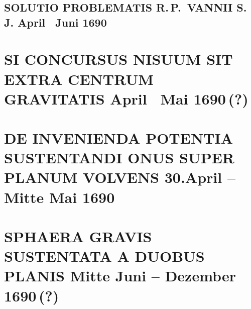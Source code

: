 \documentclass[%
fontsize=10pt,
]{scrbook}
\DeclareRobustCommand{\bracks}[1]{%
\textup{\lbrack}#1\textup{\rbrack}}
\begin{document}
\section[tocentry={Solutio problematis R.\,P.~Vannii S.\,J.
\enskip \bracks{April \textendash\ Juni 1690}%
},
head={Solutio problematis R.\,P.~Vannii S.\,J.}]
{\MakeUppercase{Solutio problematis R.\,P.~Vannii S.\,J.}
\newline \bracks{April \textendash\ Juni 1690}%
}
\label{41823}






\chapter[tocentry={Si concursus nisuum sit extra centrum gravitatis
\enskip \bracks{April \textendash\ Mai 1690\,(?)}%
},
head={Si concursus nisuum sit extra centrum gravitatis}]
{\MakeUppercase{Si concursus nisuum sit extra centrum gravitatis}
\newline \bracks{April \textendash\ Mai 1690\,(?)}%
}

\label{60314}





\chapter[tocentry={De invenienda potentia sustentandi onus super planum volvens
\enskip \bracks{30.\;April -- Mitte Mai 1690}},
head={De invenienda potentia sustentandi onus super planum volvens}]
{\MakeUppercase{De invenienda potentia sustentandi onus super planum volvens}
\newline \bracks{30.\;April -- Mitte Mai 1690}}
\label{60116}






\chapter[tocentry={Sphaera gravis sustentata a duobus planis
\enskip \bracks{Mitte Juni -- Dezember 1690\,(?)}},
head={Sphaera gravis sustentata a duobus planis}]
{\MakeUppercase{Sphaera gravis sustentata a duobus planis}
\newline \bracks{Mitte Juni -- Dezember 1690\,(?)}}
\label{60113}

\end{document}
